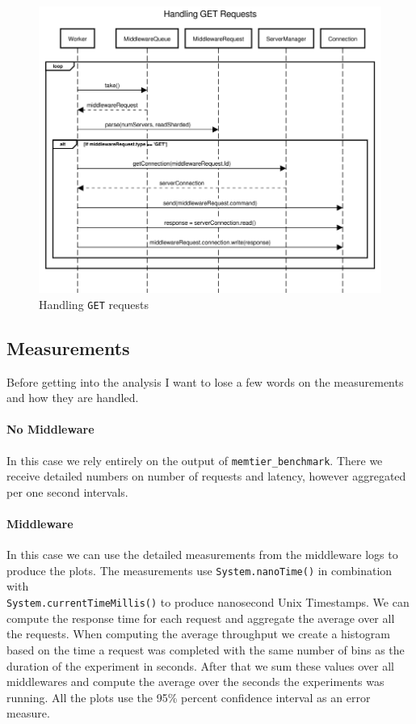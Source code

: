 \documentclass[11pt,a4paper]{article}
\begin{document}
%
\begin{figure}[H]
    \includegraphics[width=\linewidth]{../illustrations/handling_get.png}
    \caption{Handling \texttt{GET} requests}
    \label{fig:handling_get}
\end{figure}
%
\subsection{Measurements}
%
Before getting into the analysis I want to lose a few words on the measurements and how they are handled.
%
\paragraph{No Middleware}
%
In this case we rely entirely on the output of \texttt{memtier\_benchmark}.
%
There we receive detailed numbers on number of requests and latency, however aggregated per one second intervals.
%
\paragraph{Middleware}
%
In this case we can use the detailed measurements from the middleware logs to produce the plots.
%
The measurements use \texttt{System.nanoTime()} in combination with \\ \texttt{System.currentTimeMillis()} to produce nanosecond Unix Timestamps.
%
We can compute the response time for each request and aggregate the average over all the requests.
%
When computing the average throughput we create a histogram based on the time a request was completed with the same number of bins as the duration of the experiment in seconds.
%
After that we sum these values over all middlewares and compute the average over the seconds the experiments was running.
%
All the plots use the 95\% percent confidence interval as an error measure.
%
\end{document}
